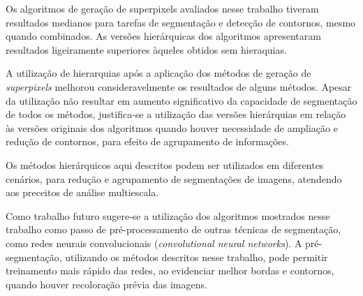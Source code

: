 \begin{document}
Os algoritmos de geração de superpixels avaliados nesse trabalho tiveram resultados medianos para tarefas de segmentação e detecção de contornos, mesmo quando combinados. As versões hierárquicas dos algoritmos apresentaram resultados ligeiramente superiores àqueles obtidos sem hieraquias.

A utilização de hierarquias após a aplicação dos métodos de geração de \textit{superpixels} melhorou consideravelmente os resultados de alguns métodos. Apesar da utilização não resultar em aumento significativo da capacidade de segmentação de todos os métodos, justifica-se a utilização das versões hierárquias em relação às versões originais dos algoritmos quando houver necessidade de ampliação e redução de contornos, para efeito de agrupamento de informações. %

Os métodos hierárquicos aqui descritos podem ser utilizados em diferentes cenários, para redução e agrupamento de segmentações de imagens, atendendo aos preceitos de análise multiescala. 

Como trabalho futuro sugere-se a utilização dos algoritmos mostrados nesse trabalho como passo de pré-processamento de outras técnicas de segmentação, como redes neurais convolucionais (\textit{convolutional neural networks}). A pré-segmentação, utilizando os métodos descritos nesse trabalho, pode permitir treinamento mais rápido das redes, ao evidenciar melhor bordas e contornos, quando houver recoloração prévia das imagens.




\end{document}

